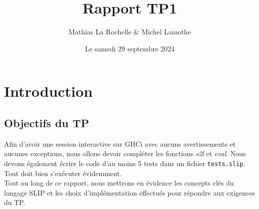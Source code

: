 \documentclass{article}
\title{Rapport TP1}
\author{Mathias La Rochelle \& Michel Lamothe}
\date{Le samedi 29 septembre 2024}
\begin{document}
\maketitle
\setlength{\parindent}{0pt}


\section{Introduction}
\subsection{Objectifs du TP}
Afin d'avoir une session interactive sur GHCi avec aucuns avertissements et aucunes exceptions, 
nous allons devoir compléter les fonctions \textit{s2l} et \textit{eval}. Nous devons également 
écrire le code d'au moins 5 tests dans un fichier \texttt{tests.slip}. Tout doit bien s'exécuter 
évidemment. \\

Tout au long de ce rapport, nous mettrons en évidence les concepts clés du langage SLIP et les 
choix d'implémentation effectués pour répondre aux exigences du TP. 
\end{document}
